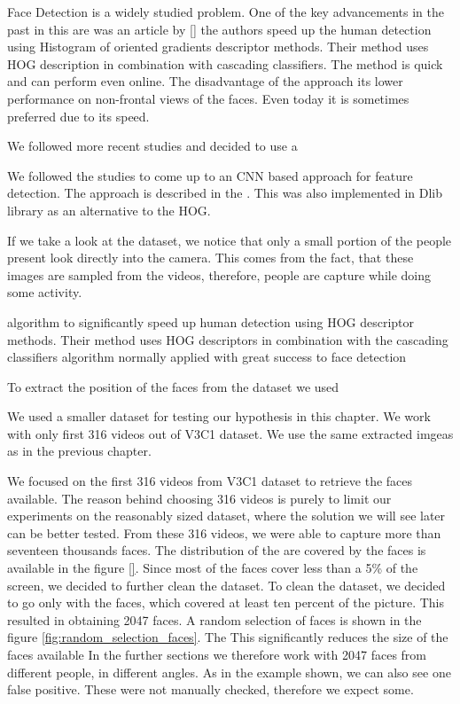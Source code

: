 Face Detection is a widely studied problem. One of the key advancements in the past in this are was an article by \ref{} the authors speed up the human detection using Histogram of oriented gradients descriptor methods. Their method uses HOG description in combination with cascading classifiers. The method is quick and can perform even online. The disadvantage of the approach its lower performance on non-frontal views of the faces. Even today it is sometimes preferred due to its speed.

We followed more recent studies and decided to use a 

We followed the studies to come up to an CNN based approach for feature detection. The approach is described in the \cite{}. This was also implemented in Dlib library as an alternative to the HOG.



If we take a look at the dataset, we notice that only a small portion of the people present look directly into the camera. This comes from the fact, that these images are sampled from the videos, therefore, people are capture while doing some activity.

 algorithm to significantly speed up human detection using HOG descriptor methods. Their method uses HOG descriptors in combination with the cascading classifiers algorithm normally applied with great success to face detection


To extract the position of the faces from the dataset we used 

We used a smaller dataset for testing our hypothesis in this chapter. We work with only first 316 videos out of V3C1 dataset. We use the same extracted imgeas as in the previous chapter.




We focused on the first 316 videos from V3C1 dataset to retrieve the faces available. The reason behind choosing 316 videos is purely to limit our experiments on the reasonably sized dataset, where the solution we will see later can be better tested. From these 316 videos, we were able to capture more than seventeen thousands faces. The distribution of the are covered by the faces is available in the figure \ref{}. Since most of the faces cover less than a 5\% of the screen, we decided to further clean the dataset.  To clean the dataset, we decided to go only with the faces, which covered at least ten percent of the picture. This resulted in obtaining 2047 faces. A random selection of faces is shown in the figure \ref{fig:random_selection_faces}. The This significantly reduces the size of the faces available
In the further sections we therefore work with 2047 faces from different people, in different angles. As in the example shown, we can also see one false positive. These were not manually checked, therefore we expect some.

